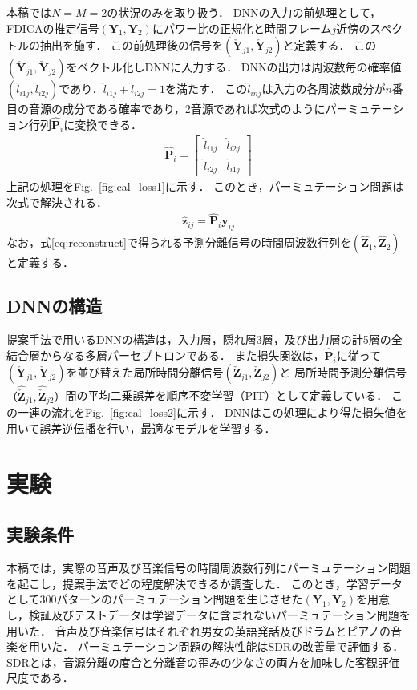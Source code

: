 \documentclass[a4j]{jsarticle}
\begin{document}
本稿では$N=M=2$の状況のみを取り扱う．
DNNの入力の前処理として，FDICAの推定信号$(\bm{Y}_1, \bm{Y}_2)$にパワー比の正規化\cite{Permutation_solverBSS}と時間フレーム$j$近傍のスペクトルの抽出を施す．
この前処理後の信号を$(\check{\bm{Y}}_{j1}, \check{\bm{Y}}_{j2})$と定義する．
この$(\check{\bm{Y}}_{j1}, \check{\bm{Y}}_{j2})$をベクトル化しDNNに入力する．
DNNの出力は周波数毎の確率値$(\hat{l}_{i1j}, \hat{l}_{i2j})$であり．$\hat{l}_{i1j}+\hat{l}_{i2j}=1$を満たす．
この$\hat{l}_{inj}$は入力の各周波数成分が$n$番目の音源の成分である確率であり，2音源であれば次式のようにパーミュテーション行列$\hat{\bm{P}}_i$に変換できる．
\begin{align}
  \hat{\bm{P}}_i = 
  \begin{bmatrix}
    \hat{l}_{i1j} & \hat{l}_{i2j} \\
    \hat{l}_{i2j} & \hat{l}_{i1j}
  \end{bmatrix} \label{eq:permMat}
\end{align}
上記の処理をFig.~\ref{fig:cal_loss1}に示す．
このとき，パーミュテーション問題は次式で解決される．
\begin{align}
  \hat{\bm{z}}_{ij} = \hat{\bm{P}}_i \bm{y}_{ij} \label{eq:reconstruct}
\end{align}
なお，式\eqref{eq:reconstruct}で得られる予測分離信号の時間周波数行列を$(\hat{\bm{Z}}_1, \hat{\bm{Z}}_2)$と定義する．
\subsection{DNNの構造}
提案手法で用いるDNNの構造は，入力層，隠れ層3層，及び出力層の計5層の全結合層からなる多層パーセプトロンである．
また損失関数は，$\hat{\bm{P}}_i$に従って$(\check{\bm{Y}}_{j1}, \check{\bm{Y}}_{j2})$を並び替えた局所時間分離信号$(\check{\bm{Z}}_{j1}, \check{\bm{Z}}_{j2})$と
局所時間予測分離信号$（\widehat{\check{\bm{Z}}}_{j1}, \widehat{\check{\bm{Z}}}_{j2}）$間の平均二乗誤差を順序不変学習（PIT）\cite{PIT}として定義している．
この一連の流れをFig.~\ref{fig:cal_loss2}に示す．
DNNはこの処理により得た損失値を用いて誤差逆伝播を行い，最適なモデルを学習する．
\section{実験}

\subsection{実験条件}
本稿では，実際の音声及び音楽信号の時間周波数行列にパーミュテーション問題を起こし，提案手法でどの程度解決できるか調査した．
このとき，学習データとして300パターンのパーミュテーション問題を生じさせた$(\bm{Y}_1, \bm{Y}_2)$を用意し，検証及びテストデータは学習データに含まれないパーミュテーション問題を用いた．
音声及び音楽信号はそれぞれ男女の英語発話及びドラムとピアノの音楽を用いた．
パーミュテーション問題の解決性能はSDRの改善量で評価する．
SDRとは，音源分離の度合と分離音の歪みの少なさの両方を加味した客観評価尺度である．
\end{document}
